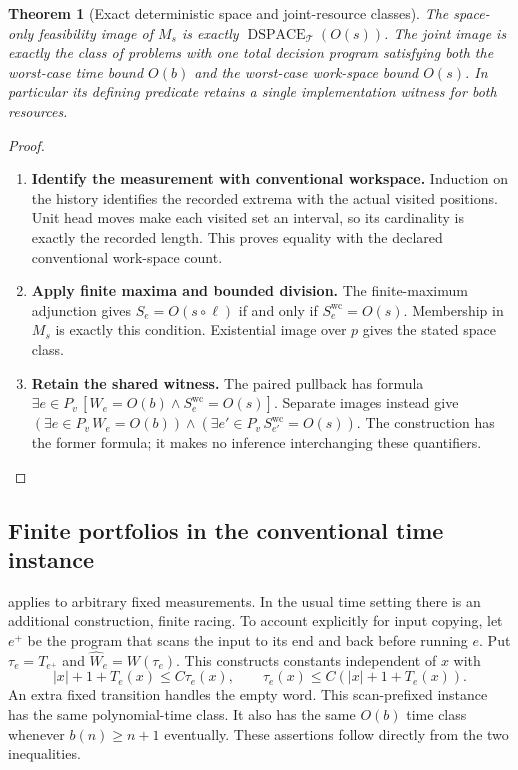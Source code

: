 \documentclass[11pt,a4paper]{article}
\numberwithin{algorithm}{section}
\numberwithin{equation}{section}
\newtheorem{theorem}{Theorem}[section]
\theoremstyle{definition}
\theoremstyle{remark}
\theoremstyle{plain}
\newcommand{\DSPACE}{\operatorname{DSPACE}}
\theoremstyle{definition}
\theoremstyle{plain}
\begin{document}
\begin{theorem}[Exact deterministic space and joint-resource classes]
\label{thm:wc-space}
The space-only feasibility image of $M_s$ is exactly
$\DSPACE_{\mathcal T}(O(s))$. The joint image is exactly the
class of problems with one total decision program satisfying both
the worst-case time bound $O(b)$ and the worst-case work-space bound
$O(s)$. In particular its defining predicate retains a single
implementation witness for both resources.
\end{theorem}
\begin{proof}\leavevmode
\begin{enumerate}[leftmargin=*,align=left]
\item \textbf{Identify the measurement with conventional workspace.}
Induction on the history identifies the recorded extrema with the
actual visited positions. Unit head moves make each visited set an
interval, so its cardinality is exactly the recorded length. This
proves equality with the declared conventional work-space count.
\item \textbf{Apply finite maxima and bounded division.}
The finite-maximum adjunction gives
$S_e=O(s\circ\ell)$ if and only if $S_e^{\mathrm{wc}}=O(s)$.
Membership in $M_s$ is exactly this condition. Existential image
over $p$ gives the stated space class.
\item \textbf{Retain the shared witness.}
The paired pullback has formula
$\exists e\in P_v\,[W_e=O(b)\wedge S_e^{\mathrm{wc}}=O(s)]$.
Separate images instead give
$(\exists e\in P_v\,W_e=O(b))\wedge
(\exists e'\in P_v\,S_{e'}^{\mathrm{wc}}=O(s))$.
The construction has the former formula; it makes no inference
interchanging these quantifiers.
\end{enumerate}
\end{proof}


\subsection{Finite portfolios in the conventional time instance}

 applies to arbitrary fixed
measurements. In the usual time setting there is an additional
construction, finite racing. To account explicitly for input copying,
let $e^+$ be the program that scans the input to its end and back
before running $e$. Put $\tau_e=T_{e^+}$ and
$\widehat W_e=W(\tau_e)$. This constructs constants independent of
$x$ with
\[
 |x|+1+T_e(x)\le C\tau_e(x),\qquad
 \tau_e(x)\le C(|x|+1+T_e(x)).
\]
An extra fixed transition handles the empty word. This scan-prefixed
instance has the same polynomial-time class. It also has the same
$O(b)$ time class whenever $b(n)\ge n+1$ eventually. These assertions
follow directly from the two inequalities.
\end{document}
